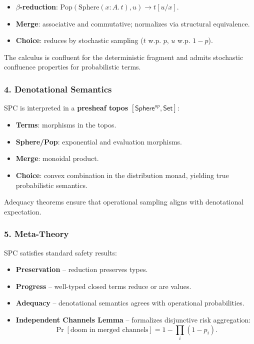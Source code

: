 \documentclass{article}
\begin{document}
\begin{itemize}
\item \textbf{$\beta$-reduction}: $\mathrm{Pop}(\mathrm{Sphere}(x:A.\,t),u) \to t[u/x]$.
\item \textbf{Merge}: associative and commutative; normalizes via structural equivalence.
\item \textbf{Choice}: reduces by stochastic sampling ($t$ w.p. $p$, $u$ w.p. $1-p$).
\end{itemize}

The calculus is confluent for the deterministic fragment and admits stochastic confluence properties for probabilistic terms.

\subsubsection{4. Denotational Semantics}

SPC is interpreted in a \textbf{presheaf topos} $[\mathsf{Sphere}^{op}, \mathsf{Set}]$:

\begin{itemize}
\item \textbf{Terms}: morphisms in the topos.
\item \textbf{Sphere/Pop}: exponential and evaluation morphisms.
\item \textbf{Merge}: monoidal product.
\item \textbf{Choice}: convex combination in the distribution monad, yielding true probabilistic semantics.
\end{itemize}

Adequacy theorems ensure that operational sampling aligns with denotational expectation.

\subsubsection{5. Meta-Theory}

SPC satisfies standard safety results:

\begin{itemize}
\item \textbf{Preservation} -- reduction preserves types.
\item \textbf{Progress} -- well-typed closed terms reduce or are values.
\item \textbf{Adequacy} -- denotational semantics agrees with operational probabilities.
\item \textbf{Independent Channels Lemma} -- formalizes disjunctive risk aggregation:
  \[
  \Pr[\text{doom in merged channels}] = 1 - \prod_i (1 - p_i).
  \]
\end{itemize}
\end{document}
